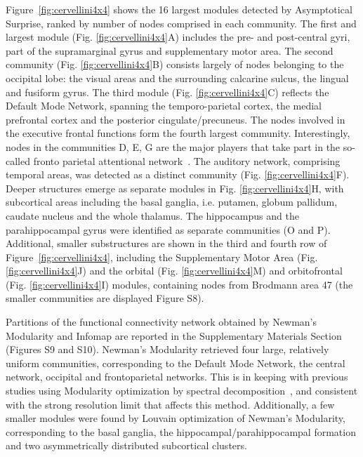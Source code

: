Figure~\ref{fig:cervellini4x4} shows the 16 largest modules detected by Asymptotical Surprise, ranked by number of nodes comprised in each community. 
The first and largest module (Fig. \ref{fig:cervellini4x4}A) includes the pre- and post-central gyri, part of the supramarginal gyrus and supplementary motor area.
The second community (Fig. \ref{fig:cervellini4x4}B) consists largely of nodes belonging to the occipital lobe: the visual areas and the surrounding calcarine sulcus, the lingual and fusiform gyrus.
The third module (Fig. \ref{fig:cervellini4x4}C) reflects the Default Mode Network, spanning the temporo-parietal cortex, the medial prefrontal cortex and the posterior cingulate/precuneus.
The nodes involved in the executive frontal functions form the fourth largest community.
Interestingly, nodes in the communities D, E, G are the major players that take part in the so-called fronto parietal attentional network~\cite{markett2014}.
The auditory network, comprising temporal areas, was detected as a distinct community (Fig. \ref{fig:cervellini4x4}F).
Deeper structures emerge as separate modules in Fig. \ref{fig:cervellini4x4}H, with subcortical areas including the basal ganglia, i.e. putamen, globum pallidum, caudate nucleus and the whole thalamus.
The hippocampus and the parahippocampal gyrus were identified as separate communities (O and P).
Additional, smaller substructures are shown in the third and fourth row of Figure~\ref{fig:cervellini4x4}, including the Supplementary Motor Area (Fig. \ref{fig:cervellini4x4}J) and the orbital (Fig. \ref{fig:cervellini4x4}M) and orbitofrontal (Fig. \ref{fig:cervellini4x4}I) modules, containing nodes from Brodmann area 47 (the smaller communities are displayed Figure S8).

Partitions of the functional connectivity network obtained by Newman's Modularity and Infomap are reported in the Supplementary Materials Section (Figures S9 and S10).
Newman's Modularity retrieved four large, relatively uniform communities, corresponding to the Default Mode Network, the central network, occipital and frontoparietal networks.
This is in keeping with previous studies using  Modularity optimization by spectral decomposition~\cite{crossley2013a}, and consistent with the strong resolution limit that affects this method.
Additionally, a few smaller modules were found by Louvain optimization of Newman's Modularity, corresponding to the basal ganglia, the hippocampal/parahippocampal formation and two asymmetrically distributed subcortical clusters.

